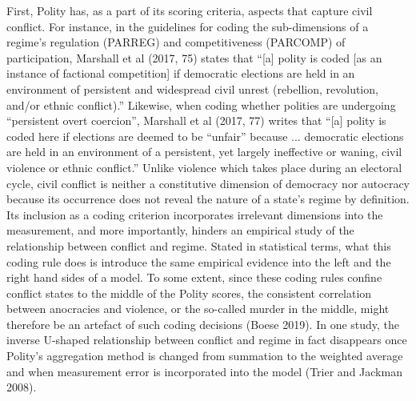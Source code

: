 \documentclass [11pt]{article}
\begin{document}
First, Polity has, as a part of its scoring criteria, aspects that capture civil conflict. For instance, in the guidelines for coding the sub-dimensions of a regime's regulation (PARREG) and competitiveness (PARCOMP) of participation, Marshall et al (2017, 75) states that ``[a] polity is coded [as an instance of factional competition] if democratic elections are held in an environment of persistent and widespread civil unrest (rebellion, revolution, and/or ethnic conflict).'' Likewise, when coding whether polities are undergoing ``persistent overt coercion'', Marshall et al (2017, 77) writes that ``[a] polity is coded here if elections are deemed to be “unfair” because ... democratic elections are held in an environment of a persistent, yet largely ineffective or waning, civil violence or ethnic conflict.'' Unlike violence which takes place during an electoral cycle, civil conflict is neither a constitutive dimension of democracy nor autocracy because its occurrence does not reveal the nature of a state's regime by definition. Its inclusion as a coding criterion incorporates irrelevant dimensions into the measurement, and more importantly, hinders an empirical study of the relationship between conflict and regime. Stated in statistical terms, what this coding rule does is introduce the same empirical evidence into the left and the right hand sides of a model. To some extent, since these coding rules confine conflict states to the middle of the Polity scores, the consistent correlation between anocracies and violence, or the so-called murder in the middle, might therefore be an artefact of such coding decisions (Boese 2019). In one study, the inverse U-shaped relationship between conflict and regime in fact disappears once Polity's aggregation method is changed from summation to the weighted average and when measurement error is incorporated into the model (Trier and Jackman 2008).
\end{document}
